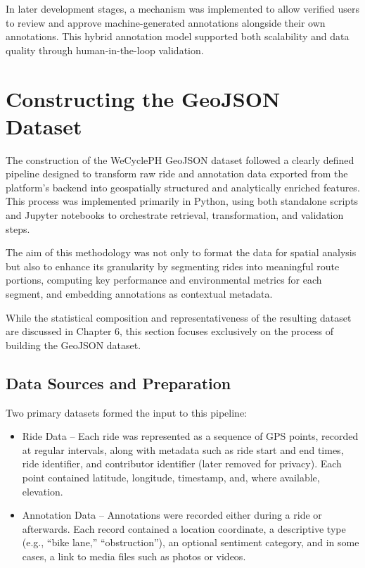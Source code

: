 In later development stages, a mechanism was implemented to allow verified users to review and approve machine-generated annotations alongside their own annotations. This hybrid annotation model supported both scalability and data quality through human-in-the-loop validation.

\section{Constructing the GeoJSON Dataset}

The construction of the WeCyclePH GeoJSON dataset followed a clearly defined pipeline designed to transform raw ride and annotation data exported from the platform’s backend into geospatially structured and analytically enriched features. This process was implemented primarily in Python, using both standalone scripts and Jupyter notebooks to orchestrate retrieval, transformation, and validation steps.

The aim of this methodology was not only to format the data for spatial analysis but also to enhance its granularity by segmenting rides into meaningful route portions, computing key performance and environmental metrics for each segment, and embedding annotations as contextual metadata.

While the statistical composition and representativeness of the resulting dataset are discussed in Chapter 6, this section focuses exclusively on the process of building the GeoJSON dataset.

\subsection{Data Sources and Preparation}

Two primary datasets formed the input to this pipeline:
\begin{itemize}
    \item Ride Data – Each ride was represented as a sequence of GPS points, recorded at regular intervals, along with metadata such as ride start and end times, ride identifier, and contributor identifier (later removed for privacy). Each point contained latitude, longitude, timestamp, and, where available, elevation.
    \item Annotation Data – Annotations were recorded either during a ride or afterwards. Each record contained a location coordinate, a descriptive type (e.g., “bike lane,” “obstruction”), an optional sentiment category, and in some cases, a link to media files such as photos or videos.
\end{itemize}

